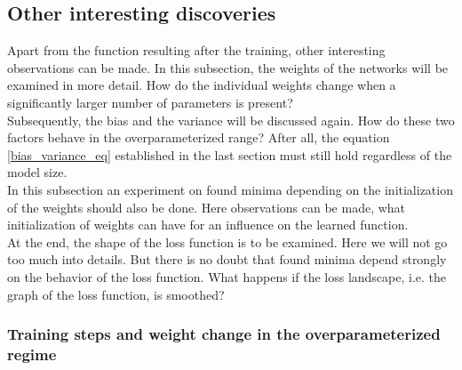 \newpage

\subsection{Other interesting discoveries}

Apart from the function resulting after the training, other interesting observations can be made. In this subsection, the weights of the networks will be examined in more detail. How do the individual weights change when a significantly larger number of parameters is present?\\
Subsequently, the bias and the variance will be discussed again. How do these two factors behave in the overparameterized range? After all, the equation \ref{bias_variance_eq} established in the last section must still hold regardless of the model size.\\
In this subsection an experiment on found minima depending on the initialization of the weights should also be done. Here observations can be made, what initialization of weights can have for an influence on the learned function.\\
At the end, the shape of the loss function is to be examined. Here we will not go too much into details. But there is no doubt that found minima depend strongly on the behavior of the loss function. What happens if the loss landscape, i.e. the graph of the loss function, is smoothed? 



\subsubsection{Training steps and weight change in the overparameterized regime}

